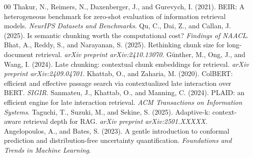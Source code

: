 \documentclass[preprint,12pt]{article}
\begin{document}
\begin{thebibliography}{00}
 Thakur, N., Reimers, N., Daxenberger, J., and Gurevych, I. (2021). BEIR: A heterogeneous benchmark for zero-shot evaluation of information retrieval models. \textit{NeurIPS Datasets and Benchmarks}.
 Qu, C., Dai, Z., and Callan, J. (2025). Is semantic chunking worth the computational cost? \textit{Findings of NAACL}.
 Bhat, A., Reddy, S., and Narayanan, S. (2025). Rethinking chunk size for long-document retrieval. \textit{arXiv preprint arXiv:2410.13070}.
 G\"unther, M., Ong, J., and Wang, I. (2024). Late chunking: contextual chunk embeddings for retrieval. \textit{arXiv preprint arXiv:2409.04701}.
 Khattab, O., and Zaharia, M. (2020). ColBERT: efficient and effective passage search via contextualized late interaction over BERT. \textit{SIGIR}.
 Sanmateu, J., Khattab, O., and Manning, C. (2024). PLAID: an efficient engine for late interaction retrieval. \textit{ACM Transactions on Information Systems}.
 Taguchi, T., Suzuki, M., and Sekine, S. (2025). Adaptive-k: context-aware retrieval depth for RAG. \textit{arXiv preprint arXiv:2501.XXXXX}.
 Angelopoulos, A., and Bates, S. (2023). A gentle introduction to conformal prediction and distribution-free uncertainty quantification. \textit{Foundations and Trends in Machine Learning}.
\end{thebibliography}
\end{document}
